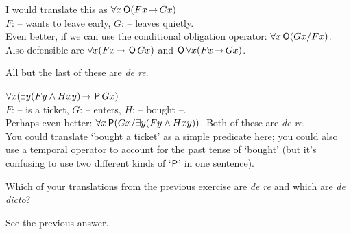 \begin{solution}
\begin{sollist}
  \item %
    I would translate this as $\forall x \Ob(Fx \to Gx)$\\
    $F$: -- wants to leave early, $G$: -- leaves quietly.\\[1mm]
    Even better, if we can use the conditional obligation operator: $\forall x \operatorname{\mathsf{O}}(Gx / Fx)$. Also defensible are
    $\forall x (Fx \to \Ob Gx)$ and $\Ob\forall x(Fx \to Gx)$.

    All but the last of these are \emph{de re}. \\[-2mm]
    
  \item %

    $\forall x (\exists y (Fy \land Hxy) \to \Pe Gx)$\\
    $F$: -- is a ticket, $G$: -- enters, $H$: -- bought --.\\[1mm]
    Perhaps even better: $\forall x \operatorname{\mathsf{P}}(Gx/ \exists y (Fy \land Hxy))$.
    Both of these are \emph{de re}.\\[1mm]
    You could translate `bought a ticket' as a simple predicate here;
    you could also use a temporal operator to account for the past
    tense of `bought' (but it's confusing to use two different kinds
    of `$\operatorname{\mathsf{P}}$' in one sentence).
    \\[-2mm]

  \end{sollist}
\end{solution}

\begin{exercise}
  Which of your translations from the previous exercise are \emph{de
    re} and which are \emph{de dicto}?
\end{exercise}
\begin{solution}
  See the previous answer.
\end{solution}

